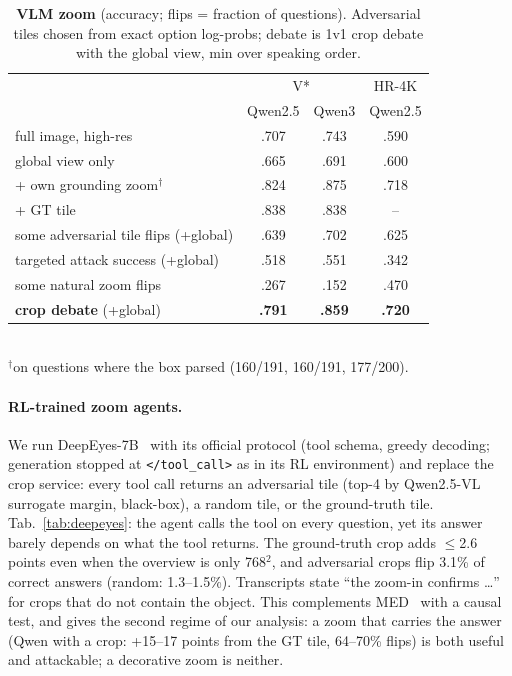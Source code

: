 \documentclass[10pt,twocolumn,letterpaper]{article}
\begin{document}
\begin{table}[t]\centering\small
\caption{\textbf{VLM zoom} (accuracy; flips = fraction of questions). Adversarial tiles chosen from exact option log-probs; debate is 1v1 crop debate with the global view, min over speaking order.}\label{tab:vlm}
\setlength{\tabcolsep}{3pt}
\begin{tabular}{@{}lccc@{}}\toprule
 & \multicolumn{2}{c}{V*} & HR-4K\\
 & Qwen2.5 & Qwen3 & Qwen2.5\\\midrule
full image, high-res & .707 & .743 & .590\\
global view only & .665 & .691 & .600\\
+ own grounding zoom$^\dagger$ & .824 & .875 & .718\\
+ GT tile & .838 & .838 & --\\\midrule
some adversarial tile flips (+global) & .639 & .702 & .625\\
targeted attack success (+global) & .518 & .551 & .342\\
some natural zoom flips & .267 & .152 & .470\\\midrule
\textbf{crop debate} (+global) & \textbf{.791} & \textbf{.859} & \textbf{.720}\\\bottomrule
\end{tabular}\\[2pt]
{\footnotesize $^\dagger$on questions where the box parsed (160/191, 160/191, 177/200).}
\end{table}

\paragraph{RL-trained zoom agents.} We run DeepEyes-7B~\cite{zheng2025deepeyes} with its official protocol (tool schema, greedy decoding; generation stopped at \texttt{</tool\_call>} as in its RL environment) and replace the crop service: every tool call returns an adversarial tile (top-4 by Qwen2.5-VL surrogate margin, black-box), a random tile, or the ground-truth tile. Tab.~\ref{tab:deepeyes}: the agent calls the tool on every question, yet its answer barely depends on what the tool returns. The ground-truth crop adds $\le$2.6 points even when the overview is only 768$^2$, and adversarial crops flip 3.1\% of correct answers (random: 1.3--1.5\%). Transcripts state ``the zoom-in confirms \ldots'' for crops that do not contain the object. This complements MED~\cite{med2026} with a causal test, and gives the second regime of our analysis: a zoom that carries the answer (Qwen with a crop: +15--17 points from the GT tile, 64--70\% flips) is both useful and attackable; a decorative zoom is neither.
\end{document}
